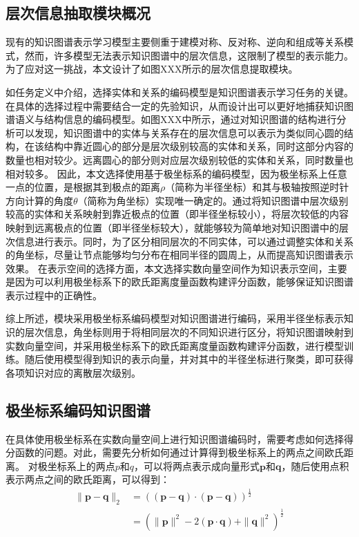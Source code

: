 \documentclass[algorithmlist, AutoFakeBold, AutoFakeSlant, figurelist, tablelist, nomlist, masters]{seuthesix}
\begin{document}
\subsection{层次信息抽取模块概况}
现有的知识图谱表示学习模型主要侧重于建模对称、反对称、逆向和组成等关系模式，然而，许多模型无法表示知识图谱中的层次信息，这限制了模型的表示能力。为了应对这一挑战，本文设计了如图XXX所示的层次信息提取模块。

如任务定义中介绍，选择实体和关系的编码模型是知识图谱表示学习任务的关键。在具体的选择过程中需要结合一定的先验知识，从而设计出可以更好地捕获知识图谱语义与结构信息的编码模型。如图XXX中所示，通过对知识图谱的结构进行分析可以发现，知识图谱中的实体与关系存在的层次信息可以表示为类似同心圆的结构，在该结构中靠近圆心的部分是层次级别较高的实体和关系，同时这部分内容的数量也相对较少。远离圆心的部分则对应层次级别较低的实体和关系，同时数量也相对较多。
因此，本文选择使用基于极坐标系的编码模型，因为极坐标系上任意一点的位置，是根据其到极点的距离$\rho$（简称为半径坐标）和其与极轴按照逆时针方向计算的角度$\theta$（简称为角坐标）实现唯一确定的。通过将知识图谱中层次级别较高的实体和关系映射到靠近极点的位置（即半径坐标较小），将层次较低的内容映射到远离极点的位置（即半径坐标较大），就能够较为简单地对知识图谱中的层次信息进行表示。同时，为了区分相同层次的不同实体，可以通过调整实体和关系的角坐标，尽量让节点能够均匀分布在相同半径的圆周上，从而提高知识图谱表示效果。
在表示空间的选择方面，本文选择实数向量空间作为知识表示空间，主要是因为可以利用极坐标系下的欧氏距离度量函数构建评分函数，能够保证知识图谱表示过程中的正确性。

综上所述，模块采用极坐标系编码模型对知识图谱进行编码，采用半径坐标表示知识的层次信息，角坐标则用于将相同层次的不同知识进行区分，将知识图谱映射到实数向量空间，并采用极坐标系下的欧氏距离度量函数构建评分函数，进行模型训练。随后使用模型得到知识的表示向量，并对其中的半径坐标进行聚类，即可获得各项知识对应的离散层次级别。

\subsection{极坐标系编码知识图谱}
在具体使用极坐标系在实数向量空间上进行知识图谱编码时，需要考虑如何选择得分函数的问题。对此，需要先分析如何通过计算得到极坐标系上的两点之间欧氏距离。
对极坐标系上的两点$p$和$q$，可以将两点表示成向量形式$\bm{p}$和$\bm{q}$，随后使用点积表示两点之间的欧氏距离，可以得到：
\begin{equation}
  \begin{aligned}
  \|\bm{p}-\bm{q}\|_2 & =\left((\bm{p}-\bm{q}) \cdot(\bm{p}-\bm{q})\right)^{\frac{1}{2}} \\
  & =\left(\|\bm{p}\|^2-2(\bm{p} \cdot \bm{q})+\|\bm{q}\|^2\right)^{\frac{1}{2}}
  \end{aligned}
\end{equation}
\end{document}
